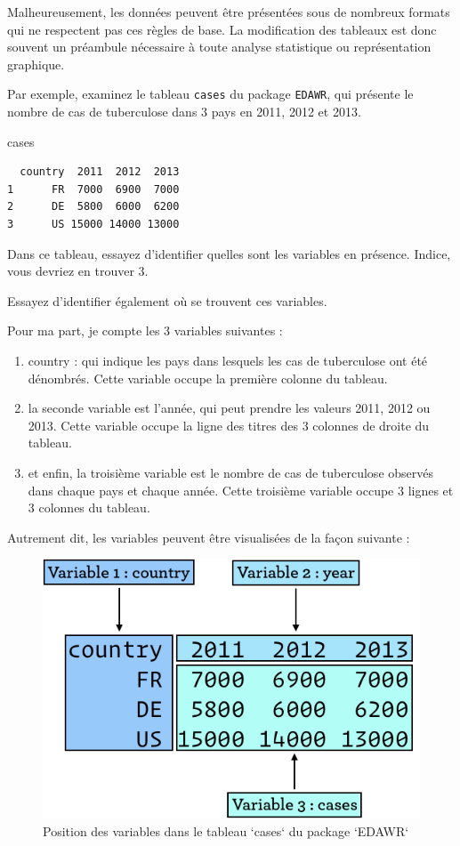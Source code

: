 \documentclass[a4paperpaper,]{article}
\newenvironment{Shaded}{\begin{snugshade}}{\end{snugshade}}
\newcommand{\NormalTok}[1]{\textcolor[rgb]{0.12,0.11,0.11}{#1}}
\providecommand{\tightlist}{%
  \setlength{\itemsep}{0pt}\setlength{\parskip}{0pt}}
\theoremstyle{definition}
\theoremstyle{definition}
\theoremstyle{definition}
\theoremstyle{remark}
\begin{document}
Malheureusement, les données peuvent être présentées sous de nombreux
formats qui ne respectent pas ces règles de base. La modification des
tableaux est donc souvent un préambule nécessaire à toute analyse
statistique ou représentation graphique.

Par exemple, examinez le tableau \texttt{cases} du package
\texttt{EDAWR}, qui présente le nombre de cas de tuberculose dans 3 pays
en 2011, 2012 et 2013.

\begin{Shaded}
\begin{Highlighting}[]
\NormalTok{cases}
\end{Highlighting}
\end{Shaded}

\begin{verbatim}
  country  2011  2012  2013
1      FR  7000  6900  7000
2      DE  5800  6000  6200
3      US 15000 14000 13000
\end{verbatim}

Dans ce tableau, essayez d'identifier quelles sont les variables en
présence. Indice, vous devriez en trouver 3.

Essayez d'identifier également où se trouvent ces variables.

Pour ma part, je compte les 3 variables suivantes :

\begin{enumerate}
\def\labelenumi{\arabic{enumi}.}
\tightlist
\item
  country : qui indique les pays dans lesquels les cas de tuberculose
  ont été dénombrés. Cette variable occupe la première colonne du
  tableau.
\item
  la seconde variable est l'année, qui peut prendre les valeurs 2011,
  2012 ou 2013. Cette variable occupe la ligne des titres des 3 colonnes
  de droite du tableau.
\item
  et enfin, la troisième variable est le nombre de cas de tuberculose
  observés dans chaque pays et chaque année. Cette troisième variable
  occupe 3 lignes et 3 colonnes du tableau.
\end{enumerate}

Autrement dit, les variables peuvent être visualisées de la façon
suivante :

\begin{figure}[htpb]

{\centering \includegraphics[width=0.5\linewidth]{images/gather} 

}

\caption{Position des variables dans le tableau `cases` du package `EDAWR`}\label{fig:gather}
\end{figure}
\end{document}
